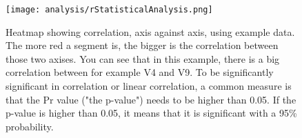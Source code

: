 







\begin{figure}[h]
    \centering
    \texttt{[image: analysis/rStatisticalAnalysis.png]}
    \caption{Heatmap showing correlation, axis against axis, using example data. The more red a segment is, the bigger is the correlation between those two axises. You can see that in this example, there is a big correlation between for example V4 and V9. To be significantly significant in correlation or linear correlation, a common measure is that the Pr value ("the p-value") needs to be higher than 0.05. If the p-value is higher than 0.05, it means that it is significant with a 95\% probability.}
    \label{fig:corrHeatmap}
\end{figure}

